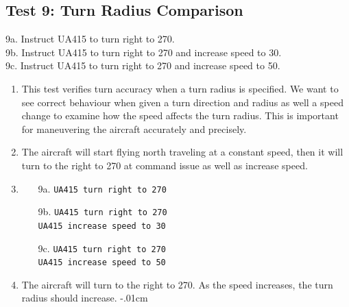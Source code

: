 \documentclass[letterpaper, 12pt]{article}
\begin{document}
\subsection{Test 9: Turn Radius Comparison}
9a. Instruct UA415 to turn right to 270.\\
9b. Instruct UA415 to turn right to 270 and increase speed to 30.\\
9c. Instruct UA415 to turn right to 270 and increase speed to 50.
\begin{enumerate}\itemsep-.15cm
\item This test verifies turn accuracy when a turn radius is specified. We want to see correct behaviour when given a turn direction and radius as well a speed change to examine how the speed affects the turn radius. This is important for maneuvering the aircraft accurately and precisely.
\item The aircraft will start flying north traveling at a constant speed, then it will turn to the right to 270 at command issue as well as increase speed.
\item \begin{enumerate}
    \item[9a.] \verb!UA415 turn right to 270!
    \item[9b.] \verb!UA415 turn right to 270!\\
        \verb!UA415 increase speed to 30!
    \item[9c.] \verb!UA415 turn right to 270!\\
        \verb!UA415 increase speed to 50!\\
    \end{enumerate}
\item The aircraft will turn to the right to 270. As the speed increases, the turn radius should increase.
\itemsep-.01cm

\end{enumerate}
\end{document}
